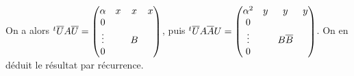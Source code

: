 {{On a alors $^t\overline UA\overline U=\begin{pmatrix}
\alpha  & x & x & x\cr
 0      &   &   &  \cr
\vdots  &   & B &  \cr
 0      &   &   &  \cr\end{pmatrix}$, 
puis
$^t\overline UA\overline AU=\begin{pmatrix}
\alpha ^2 & y & y             & y\cr
0         &   &               &  \cr
\vdots    &   & B \overline B &  \cr
0         &   &               &  \cr\end{pmatrix}$.
On en d\'eduit le r\'esultat par r\'ecurrence.
}
}
